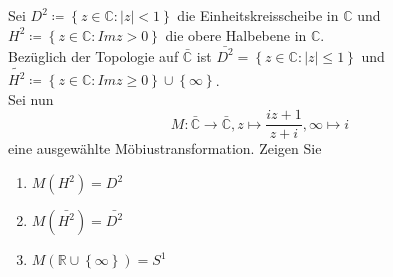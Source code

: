 \begin{assignment}
  Sei \( D^2 \coloneqq \left \{ z \in \mathbb{C} : \vert z \vert < 1 \right \} \) die Einheitskreisscheibe in \( \mathbb{C} \) und \( H^2 \coloneqq \left \{ z \in \mathbb{C} : Im z > 0 \right \} \) die obere Halbebene in \( \mathbb{C} \). \\
  Bezüglich der Topologie auf \( \bar{\mathbb{C}} \) ist \( \bar{ D^2 } = \left \{ z \in \mathbb{C} : \vert z \vert \leq 1 \right \} \) und \( \tilde{H^2} \coloneqq \left \{ z \in \mathbb{C} : Im z \geq 0 \right \} \cup \left \{ \infty \right \} \). \\
  Sei nun
  \begin{equation*}
    M: \bar{\mathbb{C}} \to \bar{\mathbb{C}}, z \mapsto \frac{iz + 1}{z + i}, \infty \mapsto i
  \end{equation*}
  eine ausgewählte Möbiustransformation. Zeigen Sie
  \begin{enumerate}[label= (\alph*)] 
    \item \( M(H^2) = D^2 \)
    \item \( M(\bar{ H^2 }) = \bar{ D^2 } \)
    \item \( M(\mathbb{R} \cup \left \{ \infty \right \}) = S^1 \)
  \end{enumerate}
\end{assignment}

